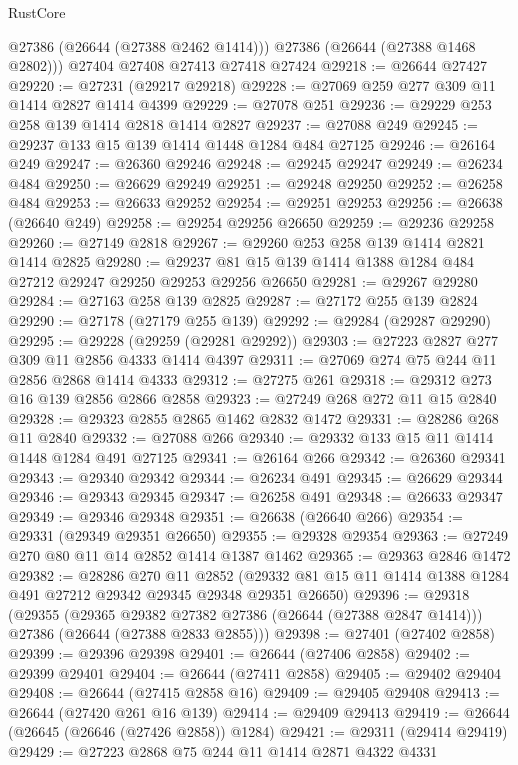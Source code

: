 \begin{lexlean}{RustCore}
\begin{coremodule}
        @27386
        (@26644 (@27388 @2462 @1414)))
      @27386
      (@26644 (@27388 @1468 @2802)))
    @27404
    @27408
    @27413
    @27418
    @27424
@29218 := @26644 @27427
@29220 := @27231 (@29217 @29218)
@29228 := @27069 @259 @277 @309 @11 @1414 @2827 @1414 @4399
@29229 := @27078 @251
@29236 := @29229 @253 @258 @139 @1414 @2818 @1414 @2827
@29237 := @27088 @249
@29245 := @29237 @133 @15 @139 @1414 @1448 @1284 @484 @27125
@29246 := @26164 @249
@29247 := @26360 @29246
@29248 := @29245 @29247
@29249 := @26234 @484
@29250 := @26629 @29249
@29251 := @29248 @29250
@29252 := @26258 @484
@29253 := @26633 @29252
@29254 := @29251 @29253
@29256 := @26638 (@26640 @249)
@29258 := @29254 @29256 @26650
@29259 := @29236 @29258
@29260 := @27149 @2818
@29267 := @29260 @253 @258 @139 @1414 @2821 @1414 @2825
@29280 := @29237 @81 @15 @139 @1414 @1388 @1284 @484 @27212 @29247 @29250 @29253 @29256 @26650
@29281 := @29267 @29280
@29284 := @27163 @258 @139 @2825
@29287 := @27172 @255 @139 @2824
@29290 := @27178 (@27179 @255 @139)
@29292 := @29284 (@29287 @29290)
@29295 := @29228 (@29259 (@29281 @29292))
@29303 := @27223 @2827 @277 @309 @11 @2856 @4333 @1414 @4397
@29311 := @27069 @274 @75 @244 @11 @2856 @2868 @1414 @4333
@29312 := @27275 @261
@29318 := @29312 @273 @16 @139 @2856 @2866 @2858
@29323 := @27249 @268 @272 @11 @15 @2840
@29328 := @29323 @2855 @2865 @1462 @2832 @1472
@29331 := @28286 @268 @11 @2840
@29332 := @27088 @266
@29340 := @29332 @133 @15 @11 @1414 @1448 @1284 @491 @27125
@29341 := @26164 @266
@29342 := @26360 @29341
@29343 := @29340 @29342
@29344 := @26234 @491
@29345 := @26629 @29344
@29346 := @29343 @29345
@29347 := @26258 @491
@29348 := @26633 @29347
@29349 := @29346 @29348
@29351 := @26638 (@26640 @266)
@29354 := @29331 (@29349 @29351 @26650)
@29355 := @29328 @29354
@29363 := @27249 @270 @80 @11 @14 @2852 @1414 @1387 @1462
@29365 := @29363 @2846 @1472
@29382 := @28286
    @270
    @11
    @2852
    (@29332 @81 @15 @11 @1414 @1388 @1284 @491 @27212 @29342 @29345 @29348 @29351 @26650)
@29396 := @29318
    (@29355
      (@29365 @29382 @27382 @27386 (@26644 (@27388 @2847 @1414)))
      @27386
      (@26644 (@27388 @2833 @2855)))
@29398 := @27401 (@27402 @2858)
@29399 := @29396 @29398
@29401 := @26644 (@27406 @2858)
@29402 := @29399 @29401
@29404 := @26644 (@27411 @2858)
@29405 := @29402 @29404
@29408 := @26644 (@27415 @2858 @16)
@29409 := @29405 @29408
@29413 := @26644 (@27420 @261 @16 @139)
@29414 := @29409 @29413
@29419 := @26644 (@26645 (@26646 (@27426 @2858)) @1284)
@29421 := @29311 (@29414 @29419)
@29429 := @27223 @2868 @75 @244 @11 @1414 @2871 @4322 @4331

\end{coremodule}
\end{lexlean}
